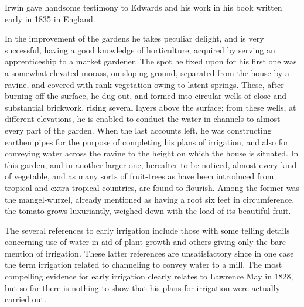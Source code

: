 Irwin gave handsome testimony to Edwards and his work in his book
written early in 1835 in England.
\begin{Quote}
	In the improvement of the gardens he takes peculiar delight,
	and is very successful, having a good knowledge of
	horticulture, acquired by serving an apprenticeship to a
	market gardener.  The spot he fixed upon for his first one was
	a somewhat elevated mor\-ass, on sloping ground, separated
	from the house by a ravine, and covered with rank vegetation
	owing to latent springs.  These, after burning off the
	surface, he dug out, and formed into circular wells of close
	and substantial brickwork, rising several layers above the
	surface; from these wells, at different elevations, he is
	enabled to conduct the water in channels to almost every part
	of the garden.  When the last accounts left, he was
	constructing earthen pipes for the purpose of completing his
	plans of irrigation, and also for conveying water across the
	ravine to the height on which the house is situated.  In this
	garden, and in another larger one, hereafter to be noticed,
	almost every kind of vegetable, and as many sorts of
	fruit-trees as have been introduced from tropical and
	extra-tropical countries, are found to flourish.  Among the
	former was the mangel-wurzel, already mentioned as having a
	root six feet in circumference, the tomato grows luxuriantly,
	weighed down with the load of its beautiful
	fruit.
\end{Quote}


\closure
The several references to early irrigation include those with some
telling details concerning use of water in aid of plant growth and
others giving only the bare mention of irrigation. These latter
references are unsatisfactory since in one case the term irrigation
related to channeling to convey water to a mill.  The most compelling
evidence for early irrigation clearly relates to Lawrence May in 1828,
but so far there is nothing to show that his plans for irrigation were
actually carried out.

